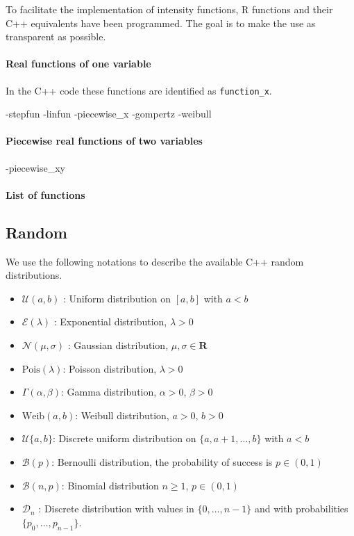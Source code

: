 To facilitate the implementation of intensity functions, R functions and their C++ equivalents have been programmed. The goal is to make the use as transparent as possible.

\hypertarget{real-functions-of-one-variable}{%
\paragraph{Real functions of one variable}\label{real-functions-of-one-variable}}

In the C++ code these functions are identified as \texttt{function\_x}.

-stepfun
-linfun
-piecewise\_x
-gompertz
-weibull

\hypertarget{piecewise-real-functions-of-two-variables}{%
\paragraph{Piecewise real functions of two variables}\label{piecewise-real-functions-of-two-variables}}

-piecewise\_xy

\hypertarget{list-of-functions}{%
\paragraph{List of functions}\label{list-of-functions}}

\hypertarget{random}{%
\subsection{Random}\label{random}}

We use the following notations to describe the available C++ random distributions.

\begin{itemize}
\item
  \(\mathcal{U}(a,b)\) : Uniform distribution on \([a, b]\) with \(a < b\)
\item
  \(\mathcal{E}(\lambda)\) : Exponential distribution, \(\lambda > 0\)
\item
  \(\mathcal{N}(\mu,\sigma)\) : Gaussian distribution, \(\mu, \sigma \in \mathbf{R}\)
\item
  \(\mathrm{Pois}(\lambda)\): Poisson distribution, \(\lambda > 0\)
\item
  \(\Gamma(\alpha, \beta)\): Gamma distribution, \(\alpha > 0\), \(\beta > 0\)
\item
  \(\mathrm{Weib}(a, b)\): Weibull distribution, \(a > 0\), \(b > 0\)
\item
  \(\mathcal{U}\{a, b\}\): Discrete uniform distribution on \(\{a, a+1, \dots, b\}\) with \(a < b\)
\item
  \(\mathcal{B}(p)\): Bernoulli distribution, the probability of success is \(p \in (0,1)\)
\item
  \(\mathcal{B}(n, p)\): Binomial distribution \(n \ge 1\), \(p \in (0,1)\)
\item
  \(\mathcal{D}_n\) : Discrete distribution with values in \(\{ 0, \dots, n-1 \}\) and with probabilities \(\{p_0, \dots, p_{n-1}\}\).
\end{itemize}


